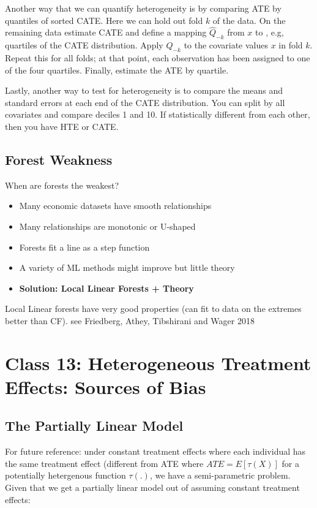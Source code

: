 \documentclass{article}
\begin{document}
Another way that we can quantify heterogeneity is by comparing ATE by quantiles of sorted CATE. Here we can hold out fold $k$ of the data. On the remaining data estimate CATE and define a mapping $\hat{Q}_{-k}$ from $x$ to , e.g, quartiles of the CATE distribution. Apply $Q_{-k}$ to the covariate values $x$ in fold $k$. Repeat this for all folds; at that point, each observation has been assigned to one of the four quartiles. Finally, estimate the ATE by quartile.

Lastly, another way to test for heterogeneity is to compare the means and standard errors at each end of the CATE distribution. You can split by all covariates and compare deciles 1 and 10. If statistically different from each other, then you have HTE or CATE.

\subsection{Forest Weakness}

When are forests the weakest? 
\begin{itemize}
    \item Many economic datasets have smooth relationships
    \item Many relationships are monotonic or U-shaped
    \item Forests fit a line as a step function
    \item A variety of ML methods might improve but little theory
    \item \textbf{Solution: Local Linear Forests + Theory}
\end{itemize}

Local Linear forests have very good properties (can fit to data on the extremes better than CF). see Friedberg, Athey, Tibshirani and Wager 2018


\section{Class 13: Heterogeneous Treatment Effects: Sources of Bias}

\subsection{The Partially Linear Model}

For future reference: under constant treatment effects where each individual has the same treatment effect (different from ATE where $ATE = E [\tau (X)]$ for a potentially hetergenous function $\tau (.)$, we have a semi-parametric problem. Given that we get a partially linear model out of assuming constant treatment effects:
\end{document}
